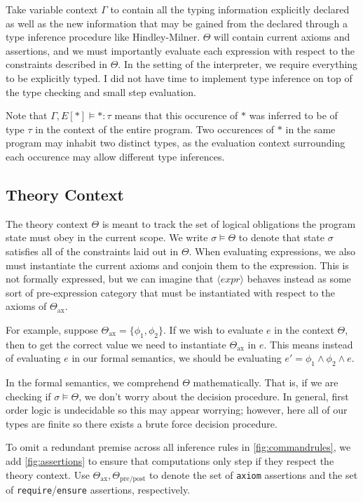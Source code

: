 \documentclass{article}
\begin{document}
\begin{multicols}{2}
    Take variable context $\Gamma$ to contain all the typing information explicitly declared as well as the new information that may be gained from the declared through a type inference procedure like Hindley-Milner. $\Theta$ will contain current axioms and assertions, and we must importantly evaluate each expression with respect to the constraints described in $\Theta$. In the setting of the interpreter, we require everything to be explicitly typed. I did not have time to implement type inference on top of the type checking and small step evaluation.

    Note that $\Gamma, E[\ast] \models \ast : \tau$ means that this occurence of $\ast$ was inferred to be of type $\tau$ in the context of the entire program. Two occurences of $\ast$ in the same program may inhabit two distinct types, as the evaluation context surrounding each occurence may allow different type inferences.

    \subsection{Theory Context}

    The theory context $\Theta$ is meant to track the set of logical obligations the program state must obey in the current scope. We write $\sigma \models \Theta$ to denote that state $\sigma$ satisfies all of the constraints laid out in $\Theta$. When evaluating expressions, we also must instantiate the current axioms and conjoin them to the expression. This is not formally expressed, but we can imagine that $\langle expr \rangle$ behaves instead as some sort of pre-expression category that must be instantiated with respect to the axioms of $\Theta_{\text{ax}}$. 

    For example, suppose $\Theta_{\text{ax}} = \{ \phi_1, \phi_2 \}$. If we wish to evaluate $e$ in the context $\Theta$, then to get the correct value we need to instantiate $\Theta_{\text{ax}}$ in $e$. This means instead of evaluating $e$ in our formal semantics, we should be evaluating $e' = \phi_1 \land \phi_2 \land e$.
    
    In the formal semantics, we comprehend $\Theta$ mathematically. That is, if we are checking if $\sigma \models \Theta$, we don't worry about the decision procedure. In general, first order logic is undecidable so this may appear worrying; however, here all of our types are finite so there exists a brute force decision procedure. 
    
    To omit a redundant premise across all inference rules in \cref{fig:commandrules}, we add \cref{fig:assertions} to ensure that computations only step if they respect the theory context. Use $\Theta_{\text{ax}}, \Theta_{\text{pre/post}}$ to denote the set of \texttt{axiom} assertions and the set of \texttt{require}/\texttt{ensure} assertions, respectively. 


\end{multicols}
\end{document}
